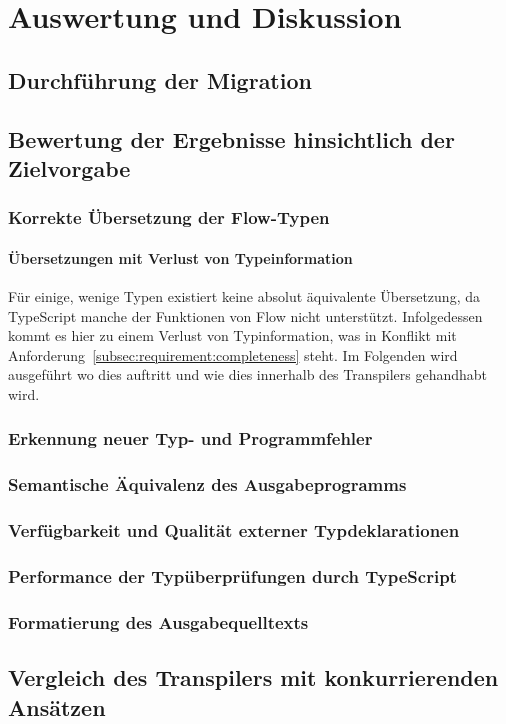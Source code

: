 \chapter{Auswertung und Diskussion}
\label{chap:evaluation}

\section{Durchführung der Migration}



\section{Bewertung der Ergebnisse hinsichtlich der Zielvorgabe}

\subsection{Korrekte Übersetzung der Flow-Typen}

\subsubsection{Übersetzungen mit Verlust von Typeinformation}

Für einige, wenige Typen existiert keine absolut äquivalente Übersetzung, da TypeScript manche der Funktionen von Flow nicht unterstützt. Infolgedessen kommt es hier zu einem Verlust von Typinformation, was in Konflikt mit Anforderung~\ref{subsec:requirement:completeness} steht. Im Folgenden wird ausgeführt wo dies auftritt und wie dies innerhalb des Transpilers gehandhabt wird.

\subsection{Erkennung neuer Typ- und Programmfehler}

\subsection{Semantische Äquivalenz des Ausgabeprogramms}

\subsection{Verfügbarkeit und Qualität externer Typdeklarationen}

\subsection{Performance der Typüberprüfungen durch TypeScript}

\subsection{Formatierung des Ausgabequelltexts}

\section{Vergleich des Transpilers mit konkurrierenden Ansätzen}
\label{evaluation:other-tools}
